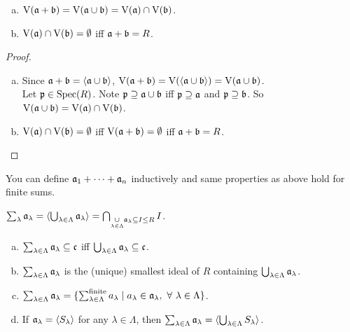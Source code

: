 \begin{proposition}
    \begin{enumerate}[(a)]
        \item $\operatorname{V}(\mathfrak{a} + \mathfrak{b}) = \operatorname{V}(\mathfrak{a} \cup \mathfrak{b}) = \operatorname{V}(\mathfrak{a}) \cap \operatorname{V}(\mathfrak{b})$.
        \item $\operatorname{V}(\mathfrak{a}) \cap \operatorname{V}(\mathfrak{b}) = \emptyset$ iff $\mathfrak{a} + \mathfrak{b} = R$.
    \end{enumerate}
\end{proposition}

\begin{proof}
    \begin{enumerate}[(a)]
        \item 
            Since $\mathfrak{a} + \mathfrak{b} = \langle \mathfrak{a} \cup \mathfrak{b} \rangle$, $\operatorname{V}(\mathfrak{a} + \mathfrak{b}) = \operatorname{V}(\langle \mathfrak{a} \cup \mathfrak{b} \rangle) = \operatorname{V}(\mathfrak{a} \cup \mathfrak{b})$. \\
            Let $\mathfrak{p} \in \operatorname{Spec}(R)$. Note $\mathfrak{p} \supseteq \mathfrak{a} \cup \mathfrak{b}$ iff $\mathfrak{p} \supseteq \mathfrak{a}$ and $\mathfrak{p} \supseteq \mathfrak{b}$. So $\operatorname{V}(\mathfrak{a} \cup \mathfrak{b}) = \operatorname{V}(\mathfrak{a}) \cap \operatorname{V}(\mathfrak{b})$.
        \item 
            $\operatorname{V}(\mathfrak{a}) \cap \operatorname{V}(\mathfrak{b}) = \emptyset$ iff $\operatorname{V}(\mathfrak{a} + \mathfrak{b}) = \emptyset$ iff $\mathfrak{a} + \mathfrak{b} = R$.
    \end{enumerate}
\end{proof}

\begin{remark}
    You can define $\mathfrak{a}_1 + \cdots + \mathfrak{a}_n$ inductively and same properties as above hold for finite sums.
\end{remark}

\begin{definition}
    $\sum_{\lambda} \mathfrak{a}_\lambda = \langle \bigcup_{\lambda \in \Lambda} \mathfrak{a}_\lambda \rangle = \bigcap_{\underset {\lambda \in \Lambda} \cup \mathfrak{a}_\lambda \subseteq I \leq R} I$.
\end{definition}

\begin{fact}
    \begin{enumerate}[(a)]
        \item $\sum_{\lambda \in \Lambda} \mathfrak{a}_\lambda \subseteq \mathfrak{c}$ iff $\bigcup_{\lambda \in \Lambda} \mathfrak{a}_\lambda \subseteq \mathfrak{c}$.
        \item $\sum_{\lambda \in \Lambda} \mathfrak{a}_\lambda$ is the (unique) smallest ideal of $R$ containing $\bigcup_{\lambda \in \Lambda} \mathfrak{a}_\lambda$.
        \item $\sum_{\lambda \in \Lambda} \mathfrak{a}_\lambda = \{\sum_{\lambda \in \Lambda}^{\text{finite}}a_\lambda \mid a_\lambda \in \mathfrak{a}_\lambda, \ \forall \  \lambda \in \Lambda\}$.
        \item If $\mathfrak{a}_\lambda = \langle S_\lambda \rangle$ for any $\lambda \in \Lambda$, then $\sum_{\lambda \in \Lambda} \mathfrak{a}_\lambda = \langle \bigcup_{\lambda \in \Lambda}S_\lambda \rangle$.
    \end{enumerate}
\end{fact}

